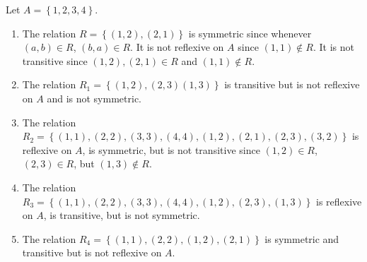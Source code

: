 \documentclass[11pt]{article}
\begin{document}
\noindent
Let  $A = \left\{ {1, 2, 3, 4} \right\}$.

\begin{enumerate}
\item The relation  $R = \left\{ {\left( {1, 2} \right), \left( {2, 1} \right)} \right\}$
 is symmetric since whenever $(a, b) \in R$, $(b, a) \in R$.  It is not reflexive on $A$ since  $\left( {1, 1} \right) \notin R$.  It is not transitive since  $\left( {1, 2} \right), \left( {2, 1} \right) \in R$  and  
$\left( {1, 1} \right) \notin R$.

\item The relation  $R_1  = \left\{ {\left( {1, 2} \right), \left( {2, 3} \right)\left( {1, 3} \right)} \right\}$ is transitive but is not reflexive on  $A$  and is not symmetric.

\item The relation  $R_2  = \left\{ {\left( {1, 1} \right), \left( {2, 2} \right), \left( {3, 3} \right), \left( {4, 4} \right), \left( {1, 2} \right), \left( {2, 1} \right), \left( {2, 3} \right), \left( {3, 2} \right)} \right\}$ is reflexive on $A$, is symmetric, but is not transitive since $\left( {1,2} \right) \in R$, $\left( {2,3} \right) \in R$, but 
$\left( {1,3} \right) \notin R$.

\item The relation  $R_3  = \left\{ {\left( {1, 1} \right), \left( {2, 2} \right), \left( {3, 3} \right), \left( {4, 4} \right), \left( {1, 2} \right), \left( {2, 3} \right), \left( {1, 3} \right)} \right\}$ is reflexive on $A$, is transitive, but is not symmetric.

\item The relation  $R_4  = \left\{ {\left( {1, 1} \right), \left( {2, 2} \right), \left( {1, 2} \right), \left( {2, 1} \right)} \right\}$ is symmetric and transitive but is not reflexive on  
$A$.
\end{enumerate}
\end{document}
